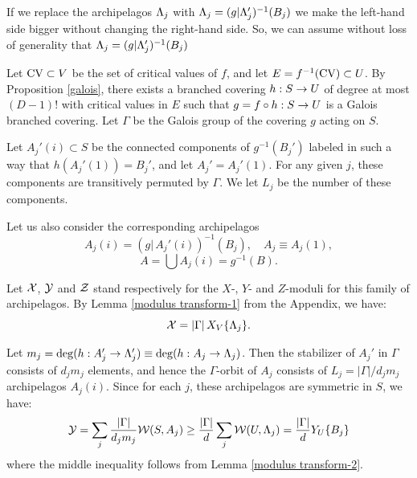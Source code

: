 \begin{pf}
If we replace the archipelagos ${\Lambda}_j$ with  ${\Lambda}_j = (g|{\Lambda}_j')^{-1}(B_j)$
we make the left-hand side bigger without changing the right-hand side.
So, we can assume without loss of generality that ${\Lambda}_j = (g|{\Lambda}_j')^{-1}(B_j)$

Let $\mathrm{CV} \subset V$ be the set of critical values of $f$,
and let $E=f^{-1}(\mathrm{CV})\subset U$.
By Proposition \ref{galois}, there exists a  branched covering $h: S\rightarrow U$ of degree at most $(D-1)!$               
 with critical values in $E$
such that $g = f\circ h: S\rightarrow U$ is a Galois branched covering.
Let $\Gamma$ be the Galois group of the covering $g$ acting on $S$. 

Let $A_j'(i) \subset S$ be the connected components of $g^{-1} (B_j')$
labeled in such a way that $h(A_j'(1))= B_j'$, and let $ A_j' =  A_j'(1)$. 
For any given $j$, these components are transitively permuted by $\Gamma$. 
We let $L_j$ be the number of these components.
 
Let us also consider the corresponding archipelagos 
$$
   A_j(i)  = (g|\, A_j'(i) )^{-1} (B_j), \quad A_j \equiv A_j(1), 
$$
$$  
                A=\bigcup A_j(i) = g^{-1} ( B).
$$


Let ${\cal X}$, ${\cal Y}$ and ${\cal Z}$ stand respectively for the $X$-, $Y$- and $Z$-moduli for this family of archipelagos.
By Lemma \ref{modulus transform-1} from the Appendix, we have:
\begin{equation}\label{XXX}
   {\cal X}= |\Gamma|\,  X_V\{{\Lambda}_j\}.
\end{equation}

Let $m_j=\deg (h: A_j' \rightarrow  {\Lambda}_j' )\equiv \deg (h: A_j\rightarrow {\Lambda}_j) $. 
Then the stabilizer of $A_j'$ in $\Gamma$ consists of $d_j m_j$ elements,
and hence the $\Gamma$-orbit of $A_j$ consists of $L_j=|\Gamma|/d_j m_j$ archipelagos $A_j(i)$. 
Since for each $j$, these archipelagos are symmetric in $S$, we have: 
\begin{equation}\label{YYY}
  {\cal Y}= \sum_j \frac {|\Gamma|}{d_j m_j} {\cal W}(S, A_j) \geq \frac {|\Gamma|}{d}  \sum_j {\cal W}(U, {\Lambda}_j)= 
                     \frac{|\Gamma|}{d} Y_U\{B_j\}
\end{equation}
where the middle inequality follows from Lemma \ref{modulus transform-2}.



\end{pf}
